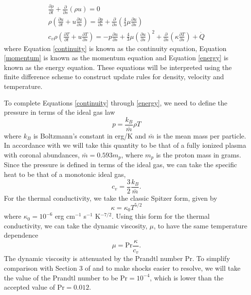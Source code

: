 \documentclass[iop]{emulateapj}
\begin{document}
				\begin{gather}
					\frac{\partial \rho}{\partial t} + \frac{\partial}{\partial s} \left( \rho u \right) = 0 \label{continuity} \\
					\rho \left( \frac{\partial u}{\partial t} + u \frac{\partial u}{\partial s} \right) = \frac{\partial p}{\partial s} + \frac{\partial}{\partial s} \left( \frac{4}{3} \mu \frac{\partial u}{\partial s} \right) \label{momentum} \\
					c_v \rho \left( \frac{\partial T}{\partial t} + u  \frac{\partial T}{\partial s} \right) = -p \frac{\partial u}{\partial s} + \frac{4}{3} \mu \left( \frac{\partial u}{\partial s} \right)^2 + \frac{\partial}{\partial s} \left( \kappa \frac{\partial T}{\partial s} \right) + \dot{Q} \label{energy}
				\end{gather}
				where Equation \ref{continuity} is known as the continuity equation, Equation \ref{momentum} is known as the momentum equation and Equation \ref{energy} is known as the energy equation. These equations will be interpreted using the finite difference scheme to construct update rules for density, velocity and temperature.
				
				To complete Equations \ref{continuity} through \ref{energy}, we need to define the pressure in terms of the ideal gas law		
				\begin{equation}
					p = \frac{k_B}{\bar{m}} \rho T \label{pressure}
				\end{equation}	
				where $k_B$ is Boltzmann's constant in erg/K and $\bar{m}$ is the mean mass per particle. In accordance with \cite{2014ApJ...795...10L} we will take this quantity to be that of a fully ionized plasma with coronal abundances, $\bar{m} = 0.593 m_p$, where $m_p$ is the proton mass in grams. Since the pressure is defined in terms of the ideal gas, we can take the specific heat to be that of a monotonic ideal gas,		
				\begin{equation}
					c_v = \frac{3}{2} \frac{k_B}{\bar{m}}. \label{specific_heat}
				\end{equation}		
				For the thermal conductivity, we take the classic Spitzer form, given by \cite{1965RvPP....1..205B}
				\begin{equation}
					\kappa = \kappa_0 T^{5/2} \label{thermal_conductivity}
				\end{equation}
				where $\kappa_0 = 10^{-6}$ erg cm$^{-1}$ s$^{-1}$ K$^{-7/2}$. Using this form for the thermal conductivity, we can take the dynamic viscosity, $\mu$, to have the same temperature dependence
				\begin{equation}
					\mu = \text{Pr} \frac{\kappa}{c_v}.\label{viscosity}
				\end{equation}
				The dynamic viscosity is attenuated by the Prandtl number Pr. To simplify comparison with Section 3 of \cite{2014ApJ...795...10L} and to make shocks easier to resolve, we will take the value of the Prandtl number to be $\text{Pr} = 10^{-4}$, which is lower than the accepted value of $\text{Pr} = 0.012$.
				
\end{document}
